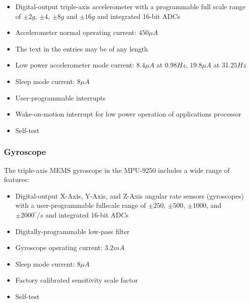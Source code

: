 \begin{itemize}
    \item Digital-output triple-axis accelerometer with a programmable full scale range  of $\pm 2g$, $\pm 4$, $\pm 8g$ and $\pm 16g$ and integrated 16-bit ADCs
    \item Accelerometer normal operating current: $450 \mu A$
    \item The text in the entries may be of any length
    \item Low power accelerometer mode current: $8.4 \mu A$ at $0.98Hz$, $19.8 \mu A$ at 31.$25Hz$
    \item Sleep mode current: $8 \mu A$
    \item User-programmable interrupts
    \item Wake-on-motion interrupt for low power operation of applications processor
    \item Self-test
\end{itemize}

\begin{figure}[H]
    \centering
    
\end{figure}

\subsubsection{Gyroscope}

The triple-axis MEMS gyroscope in the MPU-9250 includes a wide range of features:

\begin{itemize}
    \item Digital-output X-Axis, Y-Axis, and Z-Axis angular rate sensors (gyroscopes) with a user-programmable fullscale range of $\pm 250$, $\pm 500$, $\pm 1000$, and $\pm 2000^{\circ}/s$ and integrated 16-bit ADCs
    \item Digitally-programmable low-pass filter
    \item Gyroscope operating current: $3.2mA$
    \item Sleep mode current: $8 \mu A$
    \item Factory calibrated sensitivity scale factor
    \item Self-test
\end{itemize}

\begin{figure}[H]
    \centering
    
\end{figure}

